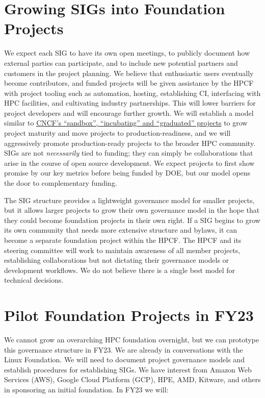 \documentclass[11pt]{article}
\begin{document}
\section{Growing SIGs into Foundation Projects}

We expect each SIG to have its own open meetings, to publicly document how external
parties can participate, and to include new potential partners and customers in the
project planning. We believe that enthusiastic users eventually become contributors, and
funded projects will be given assistance by the HPCF with project tooling such as
automation, hosting, establishing CI, interfacing with HPC facilities, and cultivating
industry partnerships. This will lower barriers for project developers and will
encourage further growth. We will establish a model similar to
\href{https://www.cncf.io/projects/}{CNCF's ``sandbox'', ``incubating'' and
  ``graduated'' projects} to grow project maturity and move projects to
production-readiness, and we will aggressively promote production-ready projects to the
broader HPC community. SIGs are not {\it necessarily} tied to funding; they can simply
be collaborations that arise in the course of open source development. We expect
projects to first show promise by our key metrics before being funded by DOE, but our
model opens the door to complementary funding.

The SIG structure provides a lightweight governance model for smaller projects, but it
allows larger projects to grow their own governance model in the hope that they could
become foundation projects in their own right. If a SIG begins to grow its own community
that needs more extensive structure and bylaws, it can become a separate foundation
project within the HPCF. The HPCF and its steering committee will work to maintain
awareness of all member projects, establishing collaborations but not dictating their
governance models or development workflows. We do not believe there is a single best
model for technical decisions.

\section{Pilot Foundation Projects in FY23}

We cannot grow an overarching HPC foundation overnight, but we can prototype this
governance structure in FY23.
We are already in conversations with the
Linux Foundation. We will need to document project governance models and establish
procedures for establishing SIGs. We have interest from Amazon Web Services (AWS),
Google Cloud Platform (GCP), HPE, AMD, Kitware, and others in sponsoring an initial
foundation. In FY23 we will:
\end{document}
